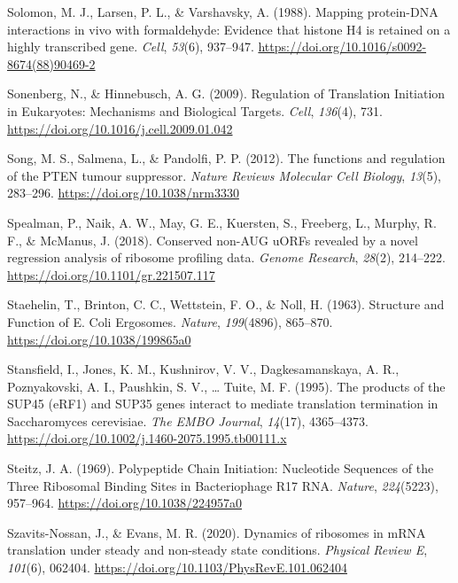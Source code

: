 \documentclass[12pt,openany]{book}
\begin{document}
\hypertarget{ref-Solomon1988}{}
Solomon, M. J., Larsen, P. L., \& Varshavsky, A. (1988). Mapping
protein-DNA interactions in vivo with formaldehyde: Evidence that
histone H4 is retained on a highly transcribed gene. \emph{Cell},
\emph{53}(6), 937--947.
\url{https://doi.org/10.1016/s0092-8674(88)90469-2}

\hypertarget{ref-Sonenberg2009}{}
Sonenberg, N., \& Hinnebusch, A. G. (2009). Regulation of Translation
Initiation in Eukaryotes: Mechanisms and Biological Targets.
\emph{Cell}, \emph{136}(4), 731.
\url{https://doi.org/10.1016/j.cell.2009.01.042}

\hypertarget{ref-Song2012}{}
Song, M. S., Salmena, L., \& Pandolfi, P. P. (2012). The functions and
regulation of the PTEN tumour suppressor. \emph{Nature Reviews Molecular
Cell Biology}, \emph{13}(5), 283--296.
\url{https://doi.org/10.1038/nrm3330}

\hypertarget{ref-Spealman2018}{}
Spealman, P., Naik, A. W., May, G. E., Kuersten, S., Freeberg, L.,
Murphy, R. F., \& McManus, J. (2018). Conserved non-AUG uORFs revealed
by a novel regression analysis of ribosome profiling data. \emph{Genome
Research}, \emph{28}(2), 214--222.
\url{https://doi.org/10.1101/gr.221507.117}

\hypertarget{ref-Staehelin1963}{}
Staehelin, T., Brinton, C. C., Wettstein, F. O., \& Noll, H. (1963).
Structure and Function of E. Coli Ergosomes. \emph{Nature},
\emph{199}(4896), 865--870. \url{https://doi.org/10.1038/199865a0}

\hypertarget{ref-Stansfield1995}{}
Stansfield, I., Jones, K. M., Kushnirov, V. V., Dagkesamanskaya, A. R.,
Poznyakovski, A. I., Paushkin, S. V., \ldots{} Tuite, M. F. (1995). The
products of the SUP45 (eRF1) and SUP35 genes interact to mediate
translation termination in Saccharomyces cerevisiae. \emph{The EMBO
Journal}, \emph{14}(17), 4365--4373.
\url{https://doi.org/10.1002/j.1460-2075.1995.tb00111.x}

\hypertarget{ref-Steitz1969}{}
Steitz, J. A. (1969). Polypeptide Chain Initiation: Nucleotide Sequences
of the Three Ribosomal Binding Sites in Bacteriophage R17 RNA.
\emph{Nature}, \emph{224}(5223), 957--964.
\url{https://doi.org/10.1038/224957a0}

\hypertarget{ref-Szavits-Nossan2020a}{}
Szavits-Nossan, J., \& Evans, M. R. (2020). Dynamics of ribosomes in
mRNA translation under steady and non-steady state conditions.
\emph{Physical Review E}, \emph{101}(6), 062404.
\url{https://doi.org/10.1103/PhysRevE.101.062404}
\end{document}
